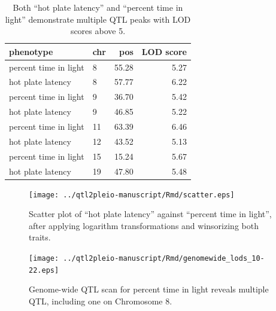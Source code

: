 \documentclass[oneside]{book}\usepackage[]{graphicx}\usepackage[]{color}
\begin{document}
\begin{appendices}
\begin{table}
\begin{center}
\end{center}
  \end{table}

\clearpage

\begin{table}
\caption{Both ``hot plate latency'' and ``percent time in light''
  demonstrate multiple QTL peaks with LOD scores above 5.}
  \label{table-peaks}
\begin{center}
\begin{tabular}{l|lrr}
  \hline
phenotype & chr & pos & LOD score \\
   \hline
percent time in light & 8 & 55.28 & 5.27 \\
 hot plate latency & 8 & 57.77 & 6.22 \\
 percent time in light & 9 & 36.70 & 5.42 \\
 hot plate latency & 9 & 46.85 & 5.22 \\
 percent time in light & 11 & 63.39 & 6.46 \\
 hot plate latency & 12 & 43.52 & 5.13 \\
 percent time in light & 15 & 15.24 & 5.67 \\
 hot plate latency & 19 & 47.80 & 5.48 \\
   \hline
\end{tabular}
\end{center}
\end{table}







\clearpage



\begin{figure}
\texttt{[image: ../qtl2pleio-manuscript/Rmd/scatter.eps]}
\caption{Scatter plot of ``hot plate latency'' against ``percent time in
  light'', after applying logarithm transformations and winsorizing
  both traits.}
\label{fig:scatter}
\end{figure}


\begin{figure}
\texttt{[image: ../qtl2pleio-manuscript/Rmd/genomewide\_lods\_10-22.eps]}
\caption{Genome-wide QTL scan for percent time in light reveals
  multiple QTL, including one on Chromosome 8.}
\label{fig:genomewide10-22}
\end{figure}


\end{appendices}
\end{document}
